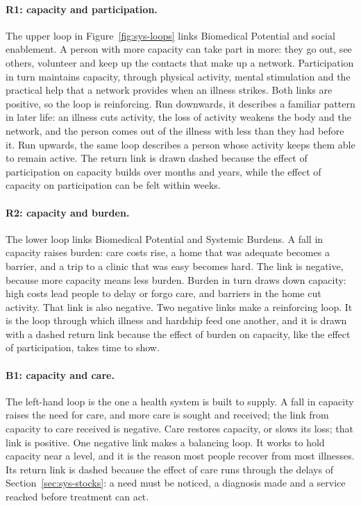 \paragraph{R1: capacity and participation.} The upper loop in
Figure~\ref{fig:sys-loops} links Biomedical Potential and social enablement.
A person with more capacity can take part in more: they go out, see others,
volunteer and keep up the contacts that make up a network. Participation in
turn maintains capacity, through physical activity, mental stimulation and the
practical help that a network provides when an illness strikes. Both links are
positive, so the loop is reinforcing. Run downwards, it describes a familiar
pattern in later life: an illness cuts activity, the loss of activity weakens
the body and the network, and the person comes out of the illness with less
than they had before it. Run upwards, the same loop describes a person whose
activity keeps them able to remain active. The return link is drawn dashed
because the effect of participation on capacity builds over months and years,
while the effect of capacity on participation can be felt within weeks.

\paragraph{R2: capacity and burden.} The lower loop links Biomedical Potential
and Systemic Burdens. A fall in capacity raises burden: care costs rise, a
home that was adequate becomes a barrier, and a trip to a clinic that was
easy becomes hard. The link is negative, because more capacity means less
burden. Burden in turn draws down capacity: high costs lead people to delay or
forgo care, and barriers in the home cut activity. That link is also negative.
Two negative links make a reinforcing loop. It is the loop through which
illness and hardship feed one another, and it is drawn with a dashed return
link because the effect of burden on capacity, like the effect of
participation, takes time to show.

\paragraph{B1: capacity and care.} The left-hand loop is the one a health
system is built to supply. A fall in capacity raises the need for care, and
more care is sought and received; the link from capacity to care received is
negative. Care restores capacity, or slows its loss; that link is positive.
One negative link makes a balancing loop. It works to hold capacity near a
level, and it is the reason most people recover from most illnesses. Its
return link is dashed because the effect of care runs through the delays of
Section~\ref{sec:sys-stocks}: a need must be noticed, a diagnosis made and a
service reached before treatment can act.


